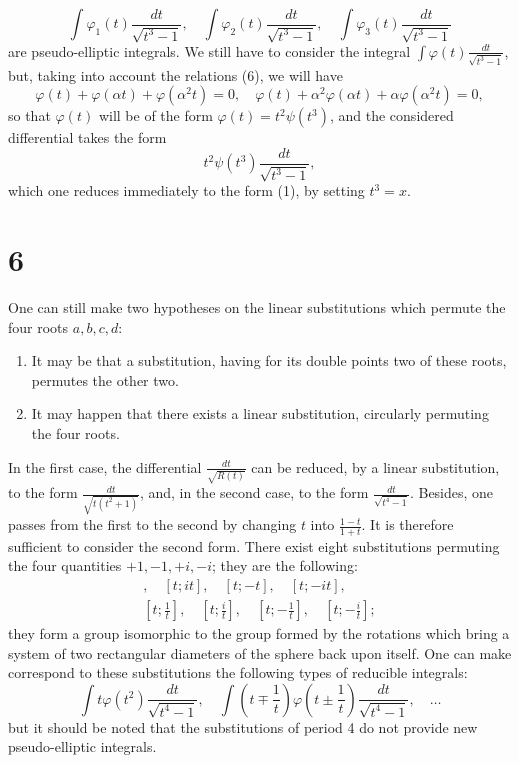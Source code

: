 \documentclass[11pt]{article}
\begin{document}
\begin{equation*}
\int\varphi_{1}(t)\frac{dt}{\sqrt{t^{3}-1}}, \quad \int\varphi_{2}(t)\frac{dt}{\sqrt{t^{3}-1}}, \quad \int\varphi_{3}(t)\frac{dt}{\sqrt{t^{3}-1}}
\end{equation*}
are pseudo-elliptic integrals. We still have to consider the integral $\int\varphi(t)\frac{dt}{\sqrt{t^{3}-1}}$, but, taking into account the relations (6), we will have
\begin{equation*}
\varphi(t)+\varphi(\alpha t)+\varphi(\alpha^{2}t)=0, \quad \varphi(t)+\alpha^{2}\varphi(\alpha t)+\alpha\varphi(\alpha^{2}t)=0,
\end{equation*}
so that $\varphi(t)$ will be of the form $\varphi(t)=t^{2}\psi(t^{3})$, and the considered differential takes the form
\begin{equation*}
t^{2}\psi(t^{3})\frac{dt}{\sqrt{t^{3}-1}},
\end{equation*}
which one reduces immediately to the form (1), by setting $t^{3}=x$.

\section*{6}

One can still make two hypotheses on the linear substitutions which permute the four roots $a, b, c, d$:
\begin{enumerate}
    \item It may be that a substitution, having for its double points two of these roots, permutes the other two.
    \item It may happen that there exists a linear substitution, circularly permuting the four roots.
\end{enumerate}
In the first case, the differential $\frac{dt}{\sqrt{R(t)}}$ can be reduced, by a linear substitution, to the form $\frac{dt}{\sqrt{t(t^{2}+1)}}$, and, in the second case, to the form $\frac{dt}{\sqrt{t^{4}-1}}$. Besides, one passes from the first to the second by changing $t$ into $\frac{1-t}{1+t}$. It is therefore sufficient to consider the second form. There exist eight substitutions permuting the four quantities $+1, -1, +i, -i$; they are the following:
\begin{gather*}
[t;t], \quad [t;it], \quad [t;-t], \quad [t;-it], \\
\left[t;\frac{1}{t}\right], \quad \left[t;\frac{i}{t}\right], \quad \left[t;-\frac{1}{t}\right], \quad \left[t;-\frac{i}{t}\right];
\end{gather*}
they form a group isomorphic to the group formed by the rotations which bring a system of two rectangular diameters of the sphere back upon itself. One can make correspond to these substitutions the following types of reducible integrals:
\begin{equation*}
\int t \varphi(t^2) \frac{dt}{\sqrt{t^4-1}}, \quad \int (t \mp \frac{1}{t}) \varphi(t \pm \frac{1}{t}) \frac{dt}{\sqrt{t^4-1}}, \quad \dots
\end{equation*}
but it should be noted that the substitutions of period 4 do not provide new pseudo-elliptic integrals.
\end{document}
